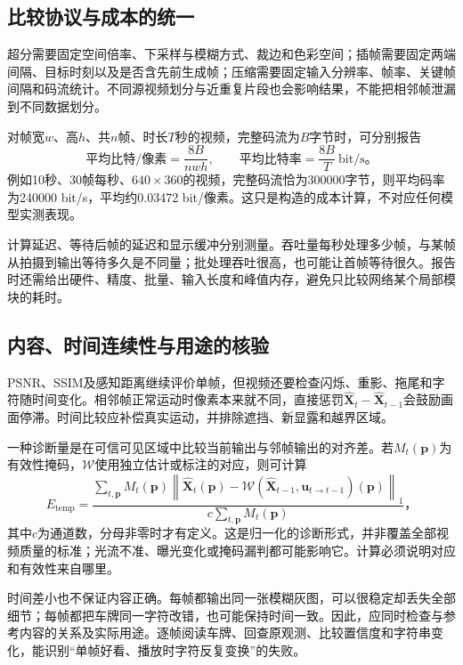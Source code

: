 \subsection{比较协议与成本的统一}
\label{sec:vision-video-restoration-protocol}

超分需要固定空间倍率、下采样与模糊方式、裁边和色彩空间；插帧需要固定两端间隔、目标时刻以及是否含先前生成帧；压缩需要固定输入分辨率、帧率、关键帧间隔和码流统计。不同源视频划分与近重复片段也会影响结果，不能把相邻帧泄漏到不同数据划分。

对帧宽$w$、高$h$、共$n$帧、时长$T$秒的视频，完整码流为$B$字节时，可分别报告
\[
  \text{平均比特/像素}=\frac{8B}{nwh},
  \qquad
  \text{平均比特率}=\frac{8B}{T}\ \mathrm{bit/s}\text{。}
\]
例如10秒、30帧每秒、$640\times360$的视频，完整码流恰为300000字节，则平均码率为240000 bit/s，平均约0.03472 bit/像素。这只是构造的成本计算，不对应任何模型实测表现。

计算延迟、等待后帧的延迟和显示缓冲分别测量。吞吐量每秒处理多少帧，与某帧从拍摄到输出等待多久是不同量；批处理吞吐很高，也可能让首帧等待很久。报告时还需给出硬件、精度、批量、输入长度和峰值内存，避免只比较网络某个局部模块的耗时。

\subsection{内容、时间连续性与用途的核验}
\label{sec:vision-video-temporal-quality}

PSNR、SSIM及感知距离继续评价单帧，但视频还要检查闪烁、重影、拖尾和字符随时间变化。相邻帧正常运动时像素本来就不同，直接惩罚$\widehat{\bm{X}}_t-\widehat{\bm{X}}_{t-1}$会鼓励画面停滞。时间比较应补偿真实运动，并排除遮挡、新显露和越界区域。

一种诊断量是在可信可见区域中比较当前输出与邻帧输出的对齐差。若$M_t(\bm{p})$为有效性掩码，$\mathcal{W}$使用独立估计或标注的对应，则可计算
\begin{equation}
  E_{\mathrm{temp}}=
  \frac{\sum_{t,\bm{p}}M_t(\bm{p})
    \left\lVert\widehat{\bm{X}}_t(\bm{p})
      -\mathcal{W}(\widehat{\bm{X}}_{t-1},
        \bm{u}_{t\to t-1})(\bm{p})\right\rVert_1}
       {c\sum_{t,\bm{p}}M_t(\bm{p})}\text{，}
  \label{eq:vision-video-temporal-error}
\end{equation}
其中$c$为通道数，分母非零时才有定义。这是归一化的诊断形式，并非覆盖全部视频质量的标准；光流不准、曝光变化或掩码漏判都可能影响它。计算必须说明对应和有效性来自哪里。

时间差小也不保证内容正确。每帧都输出同一张模糊灰图，可以很稳定却丢失全部细节；每帧都把车牌同一字符改错，也可能保持时间一致。因此，应同时检查与参考内容的关系及实际用途。逐帧阅读车牌、回查原观测、比较置信度和字符串变化，能识别“单帧好看、播放时字符反复变换”的失败。


